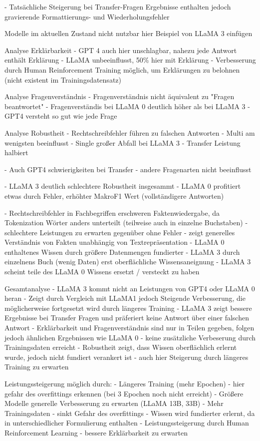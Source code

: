 - Tatsächliche Steigerung bei Transfer-Fragen
Ergebnisse enthalten jedoch gravierende Formattierungs- und Wiederholungsfehler

Modelle im aktuellen Zustand nicht nutzbar
    hier Beispiel von LLaMA 3 einfügen


Analyse Erklärbarkeit
- GPT 4 auch hier unschlagbar, nahezu jede Antwort enthält Erklärung
- LLaMA unbeeinflusst, 50\% hier mit Erklärung
- Verbesserung durch Human Reinforcement Training möglich, um Erklärungen zu belohnen (nicht existent im Trainingsdatensatz)

Analyse Fragenverständnis
- Fragenverständnis nicht äquivalent zu "Fragen beantwortet"
- Fragenverständis bei LLaMA 0 deutlich höher als bei LLaMA 3
- GPT4 versteht so gut wie jede Frage

Analyse Robustheit
- Rechtschreibfehler führen zu falschen Antworten
- Multi am wenigsten beeinflusst
- Single großer Abfall bei LLaMA 3
- Transfer Leistung halbiert

- Auch GPT4 schwierigkeiten bei Transfer
- andere Fragenarten nicht beeinflusst

- LLaMA 3 deutlich schlechtere Robustheit insgesammt
- LLaMA 0 profitiert etwas durch Fehler, erhöhter MakroF1 Wert (vollständigere Antworten)

- Rechtschreibfehler in Fachbegriffen erschweren Faktenwiedergabe, da Tokenization Wörter anders
unterteilt (teilweise auch in einzelne Buchstaben)
- schlechtere Leistungen zu erwarten gegenüber ohne Fehler
- zeigt generelles Verständnis von Fakten unabhängig von Textrepräsentation
- LLaMA 0 enthaltenes Wissen durch größere Datenmengen fundierter
- LLaMA 3 durch einzelnens Buch (wenig Daten) erst oberflächliche Wissensaneignung
- LLaMA 3 scheint teile des LLaMA 0 Wissens ersetzt / versteckt zu haben

Gesamtanalyse
- LLaMA 3 kommt nicht an Leistungen von GPT4 oder LLaMA 0 heran
- Zeigt durch Vergleich mit LLaMA1 jedoch Steigende Verbesserung, die möglicherweise fortgesetzt wird durch längeres Training
- LLaMA 3 zeigt bessere Ergebnisse bei Transfer Fragen und präferiert keine Antwort über einer falschen Antwort
- Erklärbarkeit und Fragenverständnis sind nur in Teilen gegeben, folgen jedoch ähnlichen Ergebnissen wie LLaMA 0
    - keine zusätzliche Verbeserung durch Trainingsdaten erreicht
- Robustheit zeigt, dass Wissen oberflächlich erlernt wurde, jedoch nicht fundiert verankert ist
    - auch hier Steigerung durch längeres Training zu erwarten

Leistungssteigerung möglich durch:
- Längeres Training (mehr Epochen)
    - hier gefahr des overfittings erkennen (bei 3 Epochen noch nicht erreicht)
- Größere Modelle generelle Verbesserung zu erwarten (LLaMA 13B, 33B)
- Mehr Trainingsdaten
    - sinkt Gefahr des overfittings
    - Wissen wird fundierter erlernt, da in unterschiedlicher Formulierung enthalten
- Leistungssteigerung durch Human Reinforcement Learning
    - bessere Erklärbarkeit zu erwarten


